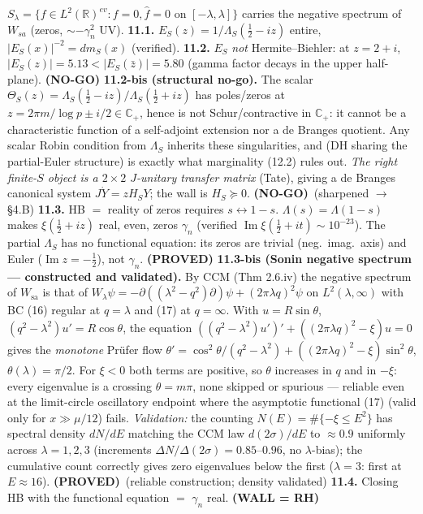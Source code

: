 \documentclass[11pt]{article}
\theoremstyle{remark}
\newcommand{\PROVED}{\textbf{(PROVED)}}
\newcommand{\NOGO}{\textbf{(NO-GO)}}
\newcommand{\WALL}{\textbf{(WALL = RH)}}
\begin{document}
$S_\lambda=\{f\in L^2(\mathbb R)^{ev}:f=0,\hat f=0\text{ on }[-\lambda,\lambda]\}$ carries the
negative spectrum of $W_{sa}$ (zeros, $\sim-\gamma_n^2$ UV).
\textbf{11.1.} $E_S(z)=1/\Lambda_S(\tfrac12-iz)$ entire, $|E_S(x)|^{-2}=dm_S(x)$ (verified).
\textbf{11.2.} $E_S$ \emph{not} Hermite--Biehler: at $z=2+i$, $|E_S(z)|=5.13<|E_S(\bar z)|=5.80$
(gamma factor decays in the upper half-plane). \NOGO
\textbf{11.2-bis (structural no-go).} The scalar
$\Theta_S(z)=\Lambda_S(\tfrac12-iz)/\Lambda_S(\tfrac12+iz)$ has poles/zeros at
$z=2\pi m/\log p\pm i/2\in\mathbb C_+$, hence is not Schur/contractive in $\mathbb C_+$: it cannot
be a characteristic function of a self-adjoint extension nor a de Branges quotient. Any scalar
Robin condition from $\Lambda_S$ inherits these singularities, and (DH sharing the partial-Euler
structure) is exactly what marginality (12.2) rules out. \emph{The right finite-$S$ object is a
$2\times2$ $J$-unitary transfer matrix} (Tate), giving a de Branges canonical system $J\dot
Y=zH_SY$; the wall is $H_S\succeq0$. \NOGO\ (sharpened $\to$ \S4.B)
\textbf{11.3.} HB $=$ reality of zeros requires $s\leftrightarrow1-s$. $\Lambda(s)=\Lambda(1-s)$
makes $\xi(\tfrac12+iz)$ real, even, zeros $\gamma_n$ (verified
$\operatorname{Im}\xi(\tfrac12+it)\sim10^{-23}$). The partial $\Lambda_S$ has no functional
equation: its zeros are trivial (neg.\ imag.\ axis) and Euler ($\operatorname{Im}z=-\tfrac12$),
not $\gamma_n$. \PROVED
\textbf{11.3-bis (Sonin negative spectrum --- constructed and validated).} By CCM
(Thm 2.6.iv) the negative spectrum of $W_{\mathrm{sa}}$ is that of
$W_\lambda\psi=-\partial((\lambda^2-q^2)\partial)\psi+(2\pi\lambda q)^2\psi$ on $L^2(\lambda,\infty)$
with BC (16) regular at $q=\lambda$ and (17) at $q=\infty$. With $u=R\sin\theta$,
$(q^2-\lambda^2)u'=R\cos\theta$, the equation
$((q^2-\lambda^2)u')'+((2\pi\lambda q)^2-\xi)u=0$ gives the \emph{monotone} Pr\"ufer flow
$\theta'=\cos^2\theta/(q^2-\lambda^2)+((2\pi\lambda q)^2-\xi)\sin^2\theta$, $\theta(\lambda)=\pi/2$.
For $\xi<0$ both terms are positive, so $\theta$ increases in $q$ and in $-\xi$: every eigenvalue
is a crossing $\theta=m\pi$, none skipped or spurious --- reliable even at the limit-circle
oscillatory endpoint where the asymptotic functional (17) (valid only for $x\gg\mu/12$) fails.
\emph{Validation:} the counting $N(E)=\#\{-\xi\le E^2\}$ has spectral density $dN/dE$ matching the
CCM law $d(2\sigma)/dE$ to $\approx0.9$ uniformly across $\lambda=1,2,3$ (increments
$\Delta N/\Delta(2\sigma)=0.85$--$0.96$, no $\lambda$-bias); the cumulative count correctly gives
zero eigenvalues below the first ($\lambda=3$: first at $E\approx16$). \PROVED\ (reliable
construction; density validated)
\textbf{11.4.} Closing HB with the functional equation $=$ $\gamma_n$ real. \WALL
\end{document}
